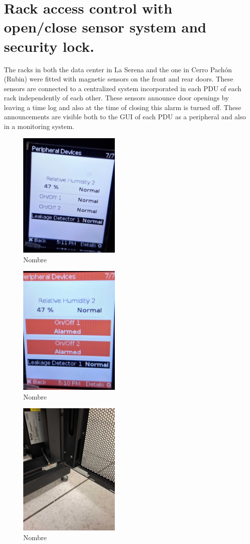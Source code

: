   \newpage

\section{Rack access control with open/close sensor system and security lock.}

The racks in both the data center in La Serena and the one in Cerro Pachón (Rubin) were fitted with magnetic sensors on the front and rear doors. These sensors are connected to a centralized system incorporated in each PDU of each rack independently of each other. These sensors announce door openings by leaving a time log and also at the time of closing this alarm is turned off. These announcements are visible both to the GUI of each PDU as a peripheral and also in a monitoring system.


\begin{figure}
    \includegraphics[width=5cm]{24.jpg}
    \centering
    \caption*{Nombre}
  \end{figure}
  \begin{figure}
    \includegraphics[width=5cm]{23.jpg}
    \centering
    \caption*{Nombre}
  \end{figure}
  \begin{figure}
    \includegraphics[width=5cm]{25.jpg}
    \centering
    \caption*{Nombre}
  \end{figure}

